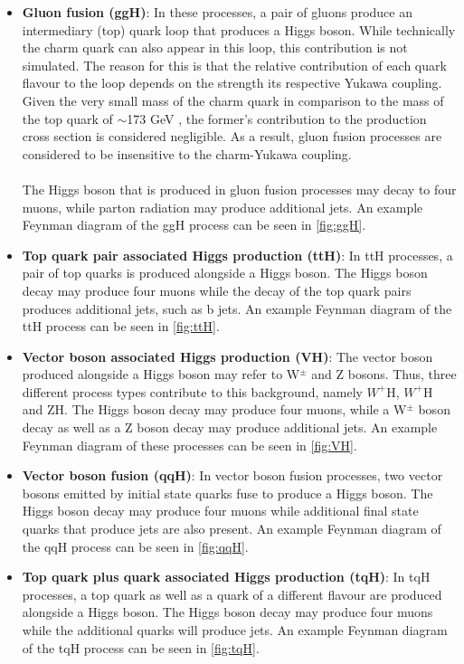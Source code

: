 \begin{itemize}
    \item \textbf{Gluon fusion (ggH)}: In these processes, a pair of gluons produce an intermediary (top) quark loop that produces a Higgs boson. While technically the charm quark can also appear in this loop, this contribution is not simulated. The reason for this is that the relative contribution of each quark flavour to the loop depends on the strength its respective Yukawa coupling. Given the very small mass of the charm quark in comparison to the mass of the top quark of $\sim$173 GeV \cite{PhysRevD.110.030001}, the former's contribution to the production cross section is considered negligible. As a result, gluon fusion processes are considered to be insensitive to the charm-Yukawa coupling.\\
    \\
    The Higgs boson that is produced in gluon fusion processes may decay to four muons, while parton radiation may produce additional jets. An example Feynman diagram of the ggH process can be seen in \autoref{fig:ggH}. 
    \item \textbf{Top quark pair associated Higgs production (ttH)}: In ttH processes, a pair of top quarks is produced alongside a Higgs boson. The Higgs boson decay may produce four muons while the decay of the top quark pairs produces additional jets, such as b jets. An example Feynman diagram of the ttH process can be seen in \autoref{fig:ttH}.
    \item \textbf{Vector boson associated Higgs production (VH)}: The vector boson produced alongside a Higgs boson may refer to W$^{\pm}$ and Z bosons. Thus, three different process types contribute to this background, namely $W^{+}$H,  $W^{+}$H and ZH. The Higgs boson decay may produce four muons, while a W$^{\pm}$ boson decay as well as a Z boson decay may produce additional jets. An example Feynman diagram of these processes can be seen in \autoref{fig:VH}.
    \item \textbf{Vector boson fusion (qqH)}: In vector boson fusion processes, two vector bosons emitted by initial state quarks fuse to produce a Higgs boson. The Higgs boson decay may produce four muons while additional final state quarks that produce jets are also present. An example Feynman diagram of the qqH process can be seen in \autoref{fig:qqH}. 
    \item \textbf{Top quark plus quark associated Higgs production (tqH)}: In tqH processes, a top quark as well as a quark of a different flavour are produced alongside a Higgs boson. The Higgs boson decay may produce four muons while the additional quarks will produce jets. An example Feynman diagram of the tqH process can be seen in \autoref{fig:tqH}.

\end{itemize}
